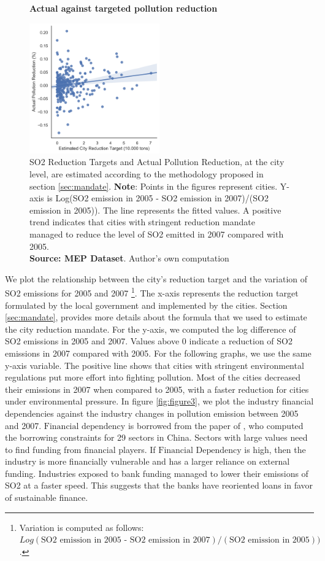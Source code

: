 \documentclass[12pt]{article}
\begin{document}
\begin{figure}[ht]
    \centering
    \textbf{Actual against targeted pollution reduction}\par\medskip
    \includegraphics[width=0.5\textwidth]{fig_2}
    \caption{
    \small
    SO2 Reduction Targets and Actual Pollution Reduction, at the city level, are estimated according to the methodology proposed in section \ref{sec:mandate}.
    \textbf{Note}: Points in the figures represent cities. Y-axis is Log(SO2 emission in 2005 - SO2 emission in 2007)/(SO2 emission in 2005)). The line represents the fitted values. A positive trend indicates that cities with stringent reduction mandate managed to reduce the level of SO2 emitted in 2007 compared with 2005. \\
    \textbf{Source: MEP Dataset}. Author's own computation}
    \label{fig:figure2}
\end{figure}

We plot the relationship between the city’s reduction target and the variation of SO2 emissions for 2005 and 2007 \footnote{Variation is computed as follows: $Log(\text{SO2 emission in 2005 - SO2 emission in 2007})/(\text{SO2 emission in 2005}))$.}. The x-axis represents the reduction target formulated by the local government and implemented by the cities. Section \ref{sec:mandate}, provides more details about the formula that we used to estimate the city reduction mandate. For the y-axis, we computed the log difference of SO2 emissions in 2005 and 2007. Values above 0 indicate a reduction of SO2 emissions in 2007 compared with 2005. For the following graphs, we use the same y-axis variable. The positive line shows that cities with stringent environmental regulations put more effort into fighting pollution. Most of the cities decreased their emissions in 2007 when compared to 2005, with a faster reduction for cities under environmental pressure. In figure \ref{fig:figure3}, we plot the industry financial dependencies against the industry changes in pollution emission between 2005 and 2007. $\text{Financial dependency}$ is borrowed from the paper of \cite{Fan2015-bm}, who computed the borrowing constraints for 29 sectors in China. Sectors with large values need to find funding from financial players. If $\text{Financial Dependency}$ is high, then the industry is more financially vulnerable and has a larger reliance on external funding. Industries exposed to bank funding managed to lower their emissions of SO2 at a faster speed. This suggests that the banks have reoriented loans in favor of sustainable finance. 
\end{document}
